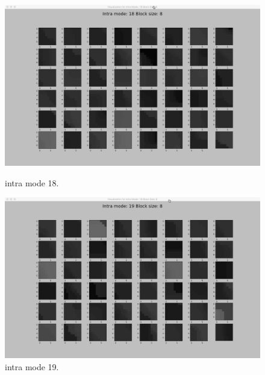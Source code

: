 \begin{figure}[H]
    \begin{minipage}{0.49\textwidth}
        \includegraphics[width=\linewidth]{Figures/visu-size8x8/8-18}
        \caption[Intra mode 18]{intra mode 18.}
        \label{fig:size8_mode18}
    \end{minipage}
    \hspace{\fill} %
    \begin{minipage}{0.49\textwidth}
        \includegraphics[width=\linewidth]{Figures/visu-size8x8/8-19}
        \caption[Intra mode 19]{intra mode 19.}
        \label{fig:size8_mode19}
    \end{minipage}
    
    \vspace*{1cm} %


\end{figure}
